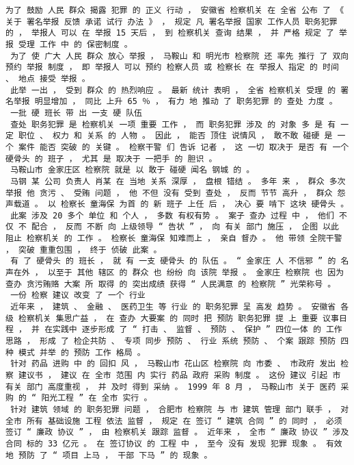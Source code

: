 \documentclass{article}
\begin{document}
\begin{Verbatim}[commandchars=\\\{\}]
 为了 鼓励 人民 群众 揭露 犯罪 的 正义 行动 ， 安徽省 检察机关 在 全省 公布 了 《 关于 署名举报 反馈 承诺 试行 办法 》 ， 规定 凡 署名举报 国家 工作人员 职务犯罪 的 ， 举报人 可以 在 举报 15 天后 ， 到 检察机关 查询 结果 ， 并 严格 规定 了 举报 受理 工作 中 的 保密制度 。 
 为了 使 广大 人民 群众 放心 举报 ， 马鞍山 和 明光市 检察院 还 率先 推行 了 双向 预约 举报 制度 ， 即 举报人 可以 预约 检察人员 或 检察长 在 举报人 指定 的 时间 、 地点 接受 举报 。 
 此举 一出 ， 受到 群众 的 热烈响应 。 最新 统计 表明 ， 全省 检察机关 受理 的 署名举报 明显增加 ， 同比 上升 65 ％ ， 有力 地 推动 了 职务犯罪 的 查处 力度 。 
 一批 硬 班长 带 出 一支 硬 队伍 
 查处 职务犯罪 是 检察机关 一项 重要 工作 ， 而 职务犯罪 涉及 的 对象 多 是 有 一定 职位 、 权力 和 关系 的 人物 。 因此 ， 能否 顶住 说情风 ， 敢不敢 碰硬 是 一个 案件 能否 突破 的 关键 。 检察干警 们 告诉 记者 ， 这 一切 取决于 是否 有 一个 硬骨头 的 班子 ， 尤其 是 取决于 一把手 的 胆识 。 
 马鞍山市 金家庄区 检察院 就是 以 敢于 碰硬 闻名 钢城 的 。 
 马钢 某 公司 负责人 肖某 在 当地 关系 深厚 ， 盘根 错结 。 多年 来 ， 群众 多次 举报 他 贪污 、 受贿 问题 ， 他 不但 没有 受到 查处 ， 反而 节节 高升 ， 群众 怨声载道 。 以 检察长 童海保 为首 的 新 班子 上任 后 ， 决心 要 啃下 这块 硬骨头 。 
 此案 涉及 20 多个 单位 和 个人 ， 多数 有权有势 。 案子 查办 过程 中 ， 他们 不仅 不 配合 ， 反而 不断 向 上级领导 “ 告状 ” ， 向 有关 部门 施压 ， 企图 以此 阻止 检察机关 的 工作 。 检察长 童海保 知难而上 ， 亲自 督办 。 他 带领 全院干警 ， 突破 重重包围 ， 终于 侦破 此案 。 
 有 了 硬骨头 的 班长 ， 就 有 一支 硬骨头 的 队伍 。 “ 金家庄 人 不信邪 ” 的 名声在外 ， 以至于 其他 辖区 的 群众 也 纷纷 向 该院 举报 。 金家庄 检察院 也 因为 查办 贪污贿赂 大案 所 取得 的 突出成绩 获得 “ 人民满意 的 检察院 ” 光荣称号 。 
 一份 检察 建议 改变 了 一个 行业 
 近年来 ， 建筑 、 金融 、 医药卫生 等 行业 的 职务犯罪 呈 高发 趋势 。 安徽省 各级 检察机关 集思广益 ， 在 查办 大要案 的 同时 把 预防 职务犯罪 提 上 重要 议事日程 ， 并 在实践中 逐步形成 了 “ 打击 、 监督 、 预防 、 保护 ” 四位一体 的 工作思路 ， 形成 了 检企共防 、 专项 同步 预防 、 行业 系统 预防 、 个案 跟踪 预防 四种 模式 并举 的 预防 工作 格局 。 
 针对 药品 进购 中 的 回扣 风 ， 马鞍山市 花山区 检察院 向 市委 、 市政府 发出 检察 建议书 ， 建议 在 全市 范围 内 实行 药品 政府 采购 制度 。 这份 建议 引起 市 有关 部门 高度重视 ， 并 及时 得到 采纳 。 1999 年 8 月 ， 马鞍山市 关于 医药 采购 的 “ 阳光工程 ” 在 全市 实行 。 
 针对 建筑 领域 的 职务犯罪 问题 ， 合肥市 检察院 与 市 建筑 管理 部门 联手 ， 对 全市 所有 基础设施 工程 依法 监督 ， 规定 在 签订 “ 建筑 合同 ” 的 同时 ， 必须 签订 “ 廉政 协议 ” ， 由 检察机关 跟踪 监督 。 近年来 ， 全市 “ 廉政 协议 ” 涉及 合同 标的 33 亿元 。 在 签订协议 的 工程 中 ， 至今 没有 发现 犯罪 现象 。 有效 地 预防 了 “ 项目 上马 ， 干部 下马 ” 的 现象 。 

\end{Verbatim}
\end{document}
